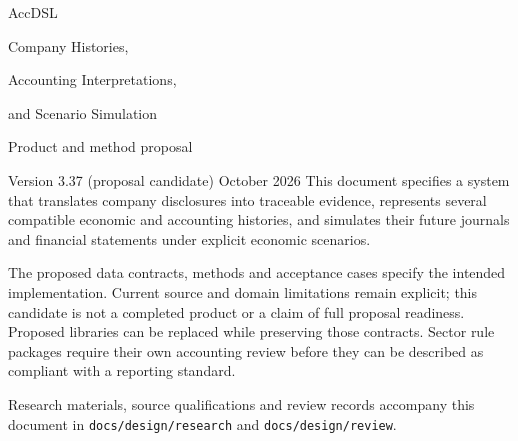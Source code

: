 \documentclass[11pt,a4paper]{report}
\newcommand{\code}[1]{\texttt{#1}}
\begin{document}
\hypersetup{pageanchor=false}
\begin{titlepage}
\vspace*{20mm}
{\sffamily\color{ink}\Huge AccDSL\par}
\vspace{7mm}
{\LARGE Company Histories,\par Accounting Interpretations,\par and Scenario Simulation\par}
\vspace{12mm}
{\Large Product and method proposal\par}
\vspace{5mm}
Version 3.37 (proposal candidate)  October 2026
\vfill
This document specifies a system that translates company disclosures into
traceable evidence, represents several compatible economic and accounting
histories, and simulates their future journals and financial statements under
explicit economic scenarios.

The proposed data contracts, methods and acceptance cases specify the intended
implementation. Current source and domain limitations remain explicit; this
candidate is not a completed product or a claim of full proposal readiness. Proposed libraries can be replaced while preserving those
contracts. Sector rule packages require their own accounting review before
they can be described as compliant with a reporting standard.

\vspace{8mm}
Research materials, source qualifications and review records accompany this
document in \code{docs/design/research} and \code{docs/design/review}.
\end{titlepage}
\hypersetup{pageanchor=true}
\tableofcontents
\clearpage{}














\appendix




\begingroup\raggedright

\endgroup
\end{document}
